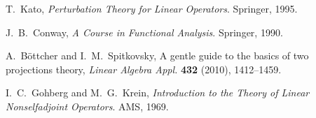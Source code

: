 \documentclass[11pt]{article}
\theoremstyle{definition}
\begin{document}
\begin{thebibliography}{9}

T.~Kato, \emph{Perturbation Theory for Linear Operators}. Springer, 1995.

J.~B.~Conway, \emph{A Course in Functional Analysis}. Springer, 1990.

A.~B{\"o}ttcher and I.~M.~Spitkovsky, A gentle guide to the basics of two projections theory,
\emph{Linear Algebra Appl.} \textbf{432} (2010), 1412--1459.

I.~C.~Gohberg and M.~G.~Krein, \emph{Introduction to the Theory of Linear Nonselfadjoint Operators}. AMS, 1969.

\end{thebibliography}
\end{document}
